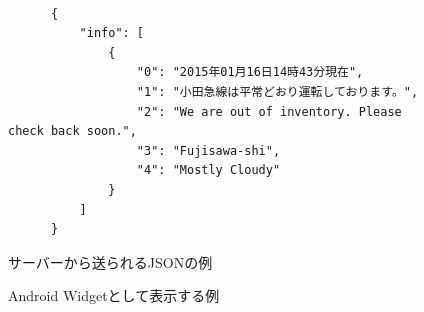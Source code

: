 \begin{figure}[htbp]
  \begin{minipage}{\hsize}
    \begin{center}
      \begin{lstlisting}[basicstyle=\ttfamily\footnotesize, frame=single]

      {
          "info": [
              {
                  "0": "2015年01月16日14時43分現在",
                  "1": "小田急線は平常どおり運転しております。",
                  "2": "We are out of inventory. Please check back soon.",
                  "3": "Fujisawa-shi",
                  "4": "Mostly Cloudy"
              }
          ]
      }

      \end{lstlisting}
    \end{center}
    \caption{サーバーから送られるJSONの例}
    \label{fig:JSON}
  \end{minipage}

  \begin{minipage}{\hsize}
    \begin{center}
    \end{center}
    \caption{Android Widgetとして表示する例}
    \label{fig:widget}
  \end{minipage}
\end{figure}

\nocite{*}
